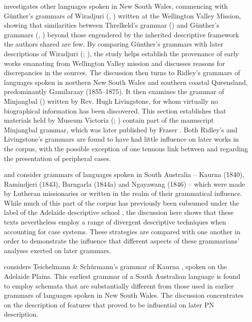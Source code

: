  investigates other languages spoken in New South Wales, commencing with Günther’s grammars of Wiradjuri (\citeyear{gunther_native_1838}, \citeyear{gunther_lecture_1840}) written at the Wellington Valley Mission, showing that similarities between Threlkeld’s grammar (\citeyear{threlkeld_australian_1834}) and Günther’s grammars (\citeyear{gunther_native_1838}, \citeyear{gunther_lecture_1840}) beyond those engendered by the inherited descriptive framework the authors shared are few. By comparing Günther’s grammars with later descriptions of Wiradjuri (\citealt{hale_languages_1846}; \citealt{mathews_wiradyuri_1904}), the study helps establish the provenance of early works emanating from Wellington Valley mission and discusses reasons for discrepancies in the sources. The discussion then turns to Ridley’s grammars of languages spoken in northern New South Wales and southern coastal Queensland, predominantly Gamilaraay (1855--1875). It then examines the grammar of Minjangbal (\citeyear{ridley_gurre_1892}) written by Rev. Hugh Livingstone, for whom virtually no biographical information has been discovered. This section establishes that materials held by Museum Victoria (\citealt{livingstone_notitle_1876}; \citealt{livingstone_notitle_1876-1}) contain part of the manuscript Minjangbal grammar, which was later published by Fraser \citep{livingstone_grammar_1892}. Both Ridley’s and Livingstone’s grammars are found to have had little influence on later works in the corpus, with the possible exception of one tenuous link between \citet{ridley_kamilaroi_1875} and \citet{roth_ethnological_1897} regarding the presentation of peripheral cases. 

 and  consider grammars of languages spoken in South Australia -- Kaurna (1840), Ramindjeri (1843), Barngarla (1844a) and Ngayawang (1846) -- which were made by Lutheran missionaries or written in the realm of their grammatical influence. While much of this part of the corpus has previously been subsumed under the label of the Adelaide descriptive school \citep[410]{simpson_notes_1992}, the discussion here shows that these texts nevertheless employ a range of divergent descriptive techniques when accounting for case systems. These strategies are compared with one another in order to demonstrate the influence that different aspects of these grammarians’ analyses exerted on later grammars.

 considers Teichelmann \& Schürmann’s grammar of Kaurna \citeyearpar{teichelmann_outlines_1840}, spoken on the Adelaide Plains. This earliest grammar of a South Australian language is found to employ schemata that are substantially different from those used in earlier grammars of languages spoken in New South Wales. The discussion concentrates on the description of features that proved to be influential on later PN description. 

